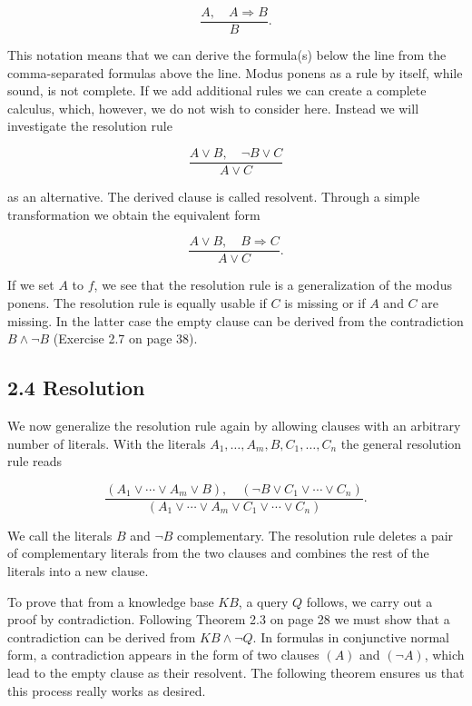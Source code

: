 \documentclass[10pt]{book}
\begin{document}
$$
\frac{A, \quad A \Rightarrow B}{B} .
$$

This notation means that we can derive the formula(s) below the line from the comma-separated formulas above the line. Modus ponens as a rule by itself, while sound, is not complete. If we add additional rules we can create a complete calculus, which, however, we do not wish to consider here. Instead we will investigate the resolution rule


\begin{equation*}
\frac{A \vee B, \quad \neg B \vee C}{A \vee C} \tag{2.1}
\end{equation*}


as an alternative. The derived clause is called resolvent. Through a simple transformation we obtain the equivalent form

$$
\frac{A \vee B, \quad B \Rightarrow C}{A \vee C} .
$$

If we set $A$ to $f$, we see that the resolution rule is a generalization of the modus ponens. The resolution rule is equally usable if $C$ is missing or if $A$ and $C$ are missing. In the latter case the empty clause can be derived from the contradiction $B \wedge \neg B$ (Exercise 2.7 on page 38).

\subsection*{2.4 Resolution}
We now generalize the resolution rule again by allowing clauses with an arbitrary number of literals. With the literals $A_{1}, \ldots, A_{m}, B, C_{1}, \ldots, C_{n}$ the general resolution rule reads


\begin{equation*}
\frac{\left(A_{1} \vee \cdots \vee A_{m} \vee B\right), \quad\left(\neg B \vee C_{1} \vee \cdots \vee C_{n}\right)}{\left(A_{1} \vee \cdots \vee A_{m} \vee C_{1} \vee \cdots \vee C_{n}\right)} . \tag{2.2}
\end{equation*}


We call the literals $B$ and $\neg B$ complementary. The resolution rule deletes a pair of complementary literals from the two clauses and combines the rest of the literals into a new clause.


To prove that from a knowledge base $K B$, a query $Q$ follows, we carry out a proof by contradiction. Following Theorem 2.3 on page 28 we must show that a contradiction can be derived from $K B \wedge \neg Q$. In formulas in conjunctive normal form, a contradiction appears in the form of two clauses $(A)$ and $(\neg A)$, which lead to the empty clause as their resolvent. The following theorem ensures us that this process really works as desired.
\end{document}
